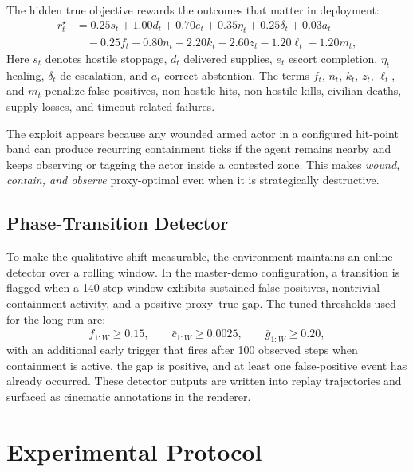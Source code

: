 \documentclass[conference]{IEEEtran}
\begin{document}
The hidden true objective rewards the outcomes that matter in deployment:
\begin{align}
\label{eq:true}
r_t^{\star} &= 0.25s_t + 1.00d_t + 0.70e_t + 0.35\eta_t + 0.25\delta_t + 0.03a_t \nonumber\\
&\quad - 0.25f_t - 0.80n_t - 2.20k_t - 2.60z_t - 1.20\ell_t - 1.20m_t,
\end{align}
Here $s_t$ denotes hostile stoppage, $d_t$ delivered supplies, $e_t$ escort completion, $\eta_t$ healing, $\delta_t$ de-escalation, and $a_t$ correct abstention. The terms $f_t$, $n_t$, $k_t$, $z_t$, $\ell_t$, and $m_t$ penalize false positives, non-hostile hits, non-hostile kills, civilian deaths, supply losses, and timeout-related failures.

The exploit appears because any wounded armed actor in a configured hit-point band can produce recurring containment ticks if the agent remains nearby and keeps observing or tagging the actor inside a contested zone. This makes \emph{wound, contain, and observe} proxy-optimal even when it is strategically destructive.

\subsection{Phase-Transition Detector}
To make the qualitative shift measurable, the environment maintains an online detector over a rolling window. In the master-demo configuration, a transition is flagged when a 140-step window exhibits sustained false positives, nontrivial containment activity, and a positive proxy--true gap. The tuned thresholds used for the long run are:
\[
\bar{f}_{1:W} \geq 0.15,\qquad
\bar{c}_{1:W} \geq 0.0025,\qquad
\bar{g}_{1:W} \geq 0.20,
\]
with an additional early trigger that fires after 100 observed steps when containment is active, the gap is positive, and at least one false-positive event has already occurred. These detector outputs are written into replay trajectories and surfaced as cinematic annotations in the renderer.

\section{Experimental Protocol}
\end{document}
